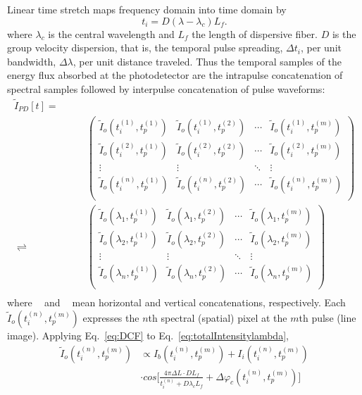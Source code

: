 \documentclass[aps,pra,reprint,longbibliography,superscriptaddress]{revtex4-1}
\DeclareMathOperator{\vercat}{cat_\downarrow} %
\DeclareMathOperator{\horcat}{cat_\rightarrow} %
\begin{document}
Linear time stretch maps frequency domain into time domain by
\begin{equation} \label{eq:DCF}
t_i = D (\lambda - \lambda_c) L_f.
\end{equation}
where $\lambda_c$ is the central wavelength and $L_f$ the length of dispersive fiber. $D$ is the group velocity dispersion, that is, the temporal pulse spreading, $\Delta t_i$, per unit bandwidth, $\Delta\lambda$, per unit distance traveled. Thus the temporal samples of the energy flux absorbed at the photodetector are the intrapulse concatenation of spectral samples followed by interpulse concatenation of pulse waveforms:
\begin{equation}
\begin{split}
\tilde{I}_{PD}[t] = \quad\quad&\quad\\
\horcat\vercat &
\begin{pmatrix}
\tilde{I}_{o}(t_i^{(1)}, t_p^{(1)})&	\tilde{I}_{o}(t_i^{(1)}, t_p^{(2)})&	\cdots& \tilde{I}_{o}(t_i^{(1)}, t_p^{(m)})\\
\tilde{I}_{o}(t_i^{(2)}, t_p^{(1)})&	\tilde{I}_{o}(t_i^{(2)}, t_p^{(2)})&	\cdots& \tilde{I}_{o}(t_i^{(2)}, t_p^{(m)})\\
\vdots&									\vdots&									\ddots& \vdots								 \\
\tilde{I}_{o}(t_i^{(n)}, t_p^{(1)})&	\tilde{I}_{o}(t_i^{(n)}, t_p^{(2)})&	\cdots& \tilde{I}_{o}(t_i^{(n)}, t_p^{(m)})\\
\end{pmatrix} \\
\rightleftharpoons \horcat\vercat &
\begin{pmatrix}
\tilde{I}_{o}(\lambda_1, t_p^{(1)})  &\tilde{I}_{o}(\lambda_1, t_p^{(2)})   &\cdots  &\tilde{I}_{o}(\lambda_1, t_p^{(m)})\\
\tilde{I}_{o}(\lambda_2, t_p^{(1)})  &\tilde{I}_{o}(\lambda_2, t_p^{(2)})   &\cdots  &\tilde{I}_{o}(\lambda_2, t_p^{(m)})\\
\vdots						   		 &\vdots							    	&\ddots  &\vdots					 \\
\tilde{I}_{o}(\lambda_n, t_p^{(1)})  &\tilde{I}_{o}(\lambda_n, t_p^{(2)})   &\cdots  &\tilde{I}_{o}(\lambda_n, t_p^{(m)})\\
\end{pmatrix} \\
\end{split}
\end{equation}
where $\horcat$ and $\vercat$ mean horizontal and vertical concatenations, respectively. Each $\tilde{I}_{o}(t_i^{(n)}, t_p^{(m)})$ expresses the $n$th spectral (spatial) pixel at the $m$th pulse (line image). Applying Eq.~\ref{eq:DCF} to Eq.~\ref{eq:totalIntensitylambda},
\begin{equation}\label{eq:afterDCF}
\begin{split}
\tilde{I}_{o}(t_i^{(n)}, t_p^{(m)}) & \propto I_b (t_i^{(n)}, t_p^{(m)}) + I_i (t_i^{(n)}, t_p^{(m)}) \\
& \cdot cos\Bigg[ \frac{4\pi\Delta L \cdot D L_f}{t_i^{(n)} + D\lambda_c L_f} + \Delta \varphi_c(t_i^{(n)}, t_p^{(m)}) \Bigg]
\end{split}
\end{equation}
\end{document}

